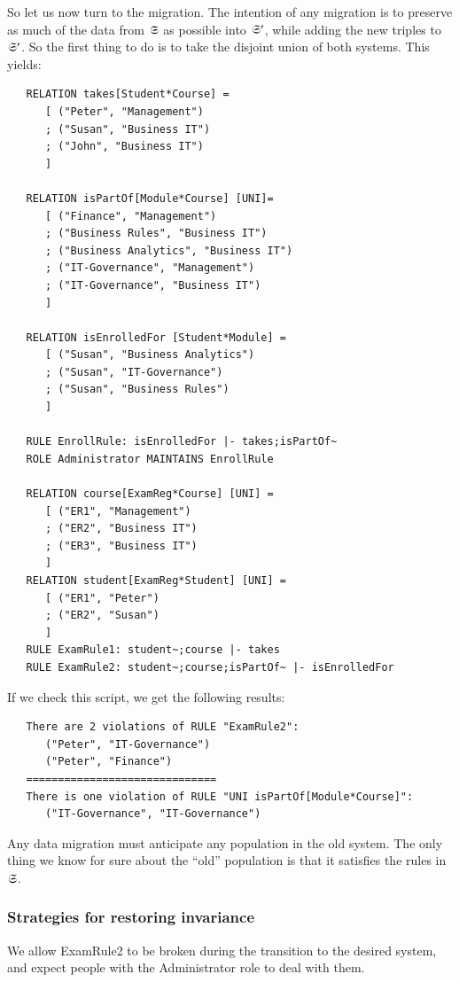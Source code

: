\documentclass{elsarticle}
\begin{document}
   So let us now turn to the migration.
   The intention of any migration is to preserve as much of the data from $\mathfrak{S}$ as possible into $\mathfrak{S}'$,
   while adding the new triples to $\mathfrak{S}'$.
   So the first thing to do is to take the disjoint union of both systems.
   This yields:
\begin{verbatim}
   RELATION takes[Student*Course] =
      [ ("Peter", "Management")
      ; ("Susan", "Business IT")
      ; ("John", "Business IT")
      ]
   
   RELATION isPartOf[Module*Course] [UNI]=
      [ ("Finance", "Management")
      ; ("Business Rules", "Business IT")
      ; ("Business Analytics", "Business IT")
      ; ("IT-Governance", "Management")
      ; ("IT-Governance", "Business IT")
      ]
   
   RELATION isEnrolledFor [Student*Module] =
      [ ("Susan", "Business Analytics")
      ; ("Susan", "IT-Governance")
      ; ("Susan", "Business Rules")
      ]
   
   RULE EnrollRule: isEnrolledFor |- takes;isPartOf~
   ROLE Administrator MAINTAINS EnrollRule
   
   RELATION course[ExamReg*Course] [UNI] =
      [ ("ER1", "Management")
      ; ("ER2", "Business IT")
      ; ("ER3", "Business IT")
      ]
   RELATION student[ExamReg*Student] [UNI] =
      [ ("ER1", "Peter")
      ; ("ER2", "Susan")
      ]
   RULE ExamRule1: student~;course |- takes
   RULE ExamRule2: student~;course;isPartOf~ |- isEnrolledFor
\end{verbatim}
   If we check this script, we get the following results:
\begin{verbatim}
   There are 2 violations of RULE "ExamRule2":
      ("Peter", "IT-Governance")
      ("Peter", "Finance")
   ==============================
   There is one violation of RULE "UNI isPartOf[Module*Course]":
      ("IT-Governance", "IT-Governance")
\end{verbatim}
   Any data migration must anticipate any population in the old system.
   The only thing we know for sure about the ``old'' population is that it satisfies the rules in $\mathfrak{S}$.

\subsubsection{Strategies for restoring invariance}

We allow ExamRule2 to be broken during the transition to the desired system, and expect people with the Administrator role to deal with them.
\end{document}
